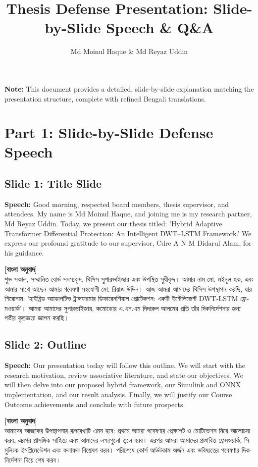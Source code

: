 \documentclass[12pt]{article}
\title{\textbf{Thesis Defense Presentation: Slide-by-Slide Speech \& Q\&A}}
\author{Md Moinul Haque \& Md Reyaz Uddin}
\date{}
\begin{document}
\maketitle

\noindent\textbf{Note:} This document provides a detailed, slide-by-slide explanation matching the presentation structure, complete with refined Bengali translations.

\section*{Part 1: Slide-by-Slide Defense Speech}

\subsection*{Slide 1: Title Slide}
\textbf{Speech:} Good morning, respected board members, thesis supervisor, and attendees. My name is Md Moinul Haque, and joining me is my research partner, Md Reyaz Uddin. Today, we present our thesis titled: 'Hybrid Adaptive Transformer Differential Protection: An Intelligent DWT–LSTM Framework.' We express our profound gratitude to our supervisor, Cdre A N M Didarul Alam, for his guidance.

\begin{bengali}
\textbf{[বাংলা অনুবাদ]} \\
শুভ সকাল, সম্মানিত বোর্ড সদস্যবৃন্দ, থিসিস সুপারভাইজার এবং উপস্থিত সুধীবৃন্দ। আমার নাম মো. মইনুল হক, এবং আমার সাথে আছেন আমার গবেষণা সহযোগী মো. রিয়াজ উদ্দিন। আজ আমরা আমাদের থিসিস উপস্থাপন করছি, যার শিরোনাম: 'হাইব্রিড অ্যাডাপটিভ ট্রান্সফরমার ডিফারেনশিয়াল প্রোটেকশন: একটি ইন্টেলিজেন্ট DWT-LSTM ফ্রেমওয়ার্ক'। আমরা আমাদের সুপারভাইজার, কমোডোর এ.এন.এম দিদারুল আলমের প্রতি তাঁর দিকনির্দেশনার জন্য গভীর কৃতজ্ঞতা জ্ঞাপন করছি।
\end{bengali}

\subsection*{Slide 2: Outline}
\textbf{Speech:} Our presentation today will follow this outline. We will start with the research motivation, review associative literature, and state our objectives. We will then delve into our proposed hybrid framework, our Simulink and ONNX implementation, and our result analysis. Finally, we will justify our Course Outcome achievements and conclude with future prospects.

\begin{bengali}
\textbf{[বাংলা অনুবাদ]} \\
আমাদের আজকের উপস্থাপনার রূপরেখাটি এমন হবে: প্রথমে আমরা গবেষণার প্রেক্ষাপট ও মোটিভেশন নিয়ে আলোচনা করব, এরপর প্রাসঙ্গিক সাহিত্য এবং আমাদের লক্ষ্যগুলো তুলে ধরব। এরপর আমরা আমাদের প্রস্তাবিত ফ্রেমওয়ার্ক, সিমুলিংক ইমপ্লিমেন্টেশন এবং ফলাফল বিশ্লেষণ করব। পরিশেষে কোর্স আউটকাম অর্জন এবং ভবিষ্যতের গবেষণার দিকনির্দেশনা দিয়ে শেষ করব।
\end{bengali}
\end{document}
